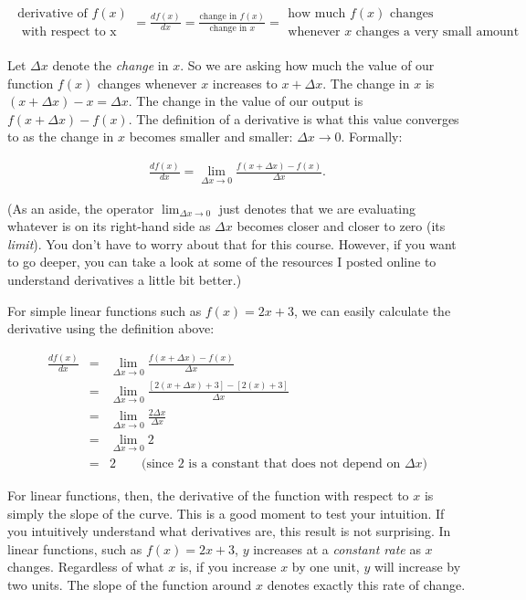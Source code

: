 \documentclass[11pt,letterpaper]{article}
\begin{document}
\begin{align*}
     \substack{ \text{derivative of } f(x) \\ \text{ with respect to x} } = \frac{df(x)}{dx} = \frac{\text{change in } f(x)}{\text{change in } x} =  \substack{\text{how much } f(x) \text{ changes} \\ \text{whenever } x \text{ changes a very small amount}} 
\end{align*}

Let $\Delta x$ denote the \textit{change} in $x$. So we are asking how much the value of our function $f(x)$ changes whenever $x$ increases to $x +\Delta x$. The change in $x$ is $(x + \Delta x) - x = \Delta x$. The change in the value of our output is $f(x+ \Delta x) - f(x)$. The definition of a derivative is what this value converges to as the change in $x$ becomes smaller and smaller: $\Delta x\to0$. Formally:

\begin{align*}
    \frac{df(x)}{dx} = \lim_{\Delta x \to 0} \frac{f(x+ \Delta x) - f(x)}{\Delta x}.    
\end{align*}

(As an aside, the operator $\lim_{\Delta x \to 0}$ just denotes that we are evaluating whatever is on its right-hand side as $\Delta x$ becomes closer and closer to zero (its \textit{limit}). You don't have to worry about that for this course. However, if you want to go deeper, you can take a look at some of the resources I posted online to understand derivatives a little bit better.)

For simple linear functions such as $f(x) = 2x + 3$, we can easily calculate the derivative using the definition above:

\begin{eqnarray*}
    \frac{df(x)}{dx} &=& \lim_{\Delta x \to 0} \frac{f(x+ \Delta x) - f(x)}{\Delta x} \\
    &=& \lim_{\Delta x \to 0} \frac{[2(x+ \Delta x) + 3 ] - [2(x) + 3 ]}{\Delta x} \\    
    &=& \lim_{\Delta x \to 0} \frac{2\Delta x}{\Delta x} \\    
    &=& \lim_{\Delta x \to 0} 2 \\    
    &=& 2  \qquad (\text{since 2 is a constant that does not depend on $\Delta x$)}    
\end{eqnarray*}

For linear functions, then, the derivative of the function with respect to $x$ is simply the slope of the curve. This is a good moment to test your intuition. If you intuitively understand what derivatives are, this result is not surprising. In linear functions, such as $f(x) = 2x + 3$, $y$ increases at a \textit{constant rate} as $x$ changes. Regardless of what $x$ is, if you increase $x$ by one unit, $y$ will increase by two units. The slope of the function around $x$ denotes exactly this rate of change.
\end{document}
